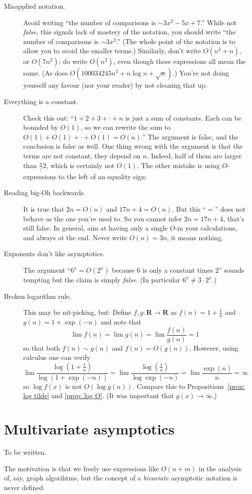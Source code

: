 \documentclass{tstextbook}
\begin{document}
\begin{description}
  \item[Misapplied notation.] 
    Avoid writing ``the number of comparisons is $\sim 3x^2  - 5x +7$.''
    While not \emph{false}, this signals lack of mastery of the notation, you should write
    ``the number of comparisons is $\sim 3x^2$.''
    (The whole point of the notation is to allow you to avoid the smaller terms.)
    Similarly, don't write $O(n^2 + n)$, or $O(7n^2)$; do write $O(n^2)$, even though these expressions all mean the same. 
    (As does $O(100034245n^2 + n\log n +\sqrt n)$.)
    You're not doing yourself any favour (nor your reader) by not cleaning that up.
  \item[Everything is a constant.]
    Check this out: ``$1+2+3+\cdot + n$ is just a sum of constants.
    Each can be bounded by $O(1)$, so we can rewrite the sum to $O(1)+ O(1) +\cdot +O(1)=O(n)$.''
    The argument is false, and the conclusion is false as well.
    One thing wrong with the argument is that the terms are not constant, they depend on $n$.
    Indeed, half of them are larger than $\frac n/2$, which is certainly not $O(1)$.
    The other mistake is using $O$-expressions to the left of an equality sign:
  \item[Reading big-Oh backwards.]
    It is true that $2n =O(n)$ and $17n+4 =O(n)$.
    But this ``$=$'' does not behave as the one you're used to.
    So you cannot infer $2n=17n+4$, that's still false.
    In general, aim at having only a single $O$-in your calculations, and always at the end.
    Never write $O(n)= 3n$, it means nothing.
  \item[Exponents don't like asymptotics.]
    The argument ``$6^x = O(2^x)$ because $6$ is only a constant times $2$'' sounds tempting but the claim is simply \emph{false}.
    (In particular $6^x \neq 3\cdot 2^x$.)
  \item[Broken logarithm rule.]
    This may be nit-picking, but:
    Define $f,g\colon \mathbf R\rightarrow \mathbf R$ as $f(n)=1+\frac1n$ and $g(n)=1+\exp(-n)$ and 
    note that \[ 
    \lim f(n) = \lim g(n)= \lim \frac{f(n)}{g(n)} = 1\,\]
    so that both $f(n)\sim g(n)$ and $f(n)=O(g(n))$.
    However, using calculus one can verify
    \[ 
    \lim \frac{\log (1+\frac1n)}{\log(1+\exp(-n))} =
    \lim \frac{\log (\frac1n)}{\log\exp(-n)} =
    \lim \frac{\exp(n)}{n}=\infty\,
    \]
    so $\log f(x)$ is not $O(\log g(n))$.
    Compare this to Propositions~\ref{prop: log tilde} and \ref{prop: log O}.
    (It was important that $g(x)\rightarrow \infty$.)
\end{description}

\section{Multivariate asymptotics}

To be written.

The motivation is that we freely use expressions like $O(n+m)$ in the analysis of, say, graph algorihtms, but the concept of a \emph{bivariate} asymptotic notation is never defined.
\end{document}
